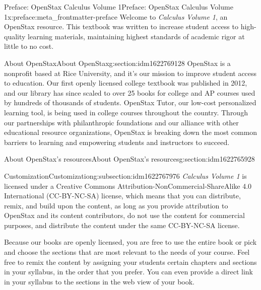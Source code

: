\documentclass[oneside,10pt,]{book}
\numberwithin{equation}{section}
\begin{document}
\begin{preface}{Preface: OpenStax Calculus Volume 1}{}{Preface: OpenStax Calculus Volume 1}{}{}{x:preface:meta_frontmatter-preface}
Welcome to \emph{Calculus Volume 1}, an OpenStax resource. This textbook was written to increase student access to high-quality learning materials, maintaining highest standards of academic rigor at little to no cost.%
%
%
\typeout{************************************************}
\typeout{************************************************}
%
\begin{sectionptx}{About OpenStax}{}{About OpenStax}{}{}{g:section:idm1622769128}
OpenStax is a nonprofit based at Rice University, and it’s our mission to improve student access to education. Our first openly licensed college textbook was published in 2012, and our library has since scaled to over 25 books for college and AP\textregistered{} courses used by hundreds of thousands of students. OpenStax Tutor, our low-cost personalized learning tool, is being used in college courses throughout the country.  Through our partnerships with philanthropic foundations and our alliance with other educational resource organizations, OpenStax is breaking down the most common barriers to learning and empowering students and instructors to succeed.%
\end{sectionptx}
%
%
\typeout{************************************************}
\typeout{************************************************}
%
\begin{sectionptx}{About OpenStax's resources}{}{About OpenStax's resources}{}{}{g:section:idm1622765928}
%
%
\typeout{************************************************}
\typeout{************************************************}
%
\begin{subsectionptx}{Customization}{}{Customization}{}{}{g:subsection:idm1622767976}
\emph{Calculus Volume 1} is licensed under a Creative Commons Attribution-NonCommercial-ShareAlike 4.0 International (CC-BY-NC-SA) license, which means that you can distribute, remix, and build upon the content, as long as you provide attribution to OpenStax and its content contributors, do not use the content for commercial purposes, and distribute the content under the same CC-BY-NC-SA license.%
\par
Because our books are openly licensed, you are free to use the entire book or pick and choose the sections that are most relevant to the needs of your course. Feel free to remix the content by assigning your students certain chapters and sections in your syllabus, in the order that you prefer. You can even provide a direct link in your syllabus to the sections in the web view of your book.%

\end{subsectionptx}
\end{sectionptx}
\end{preface}
\end{document}
